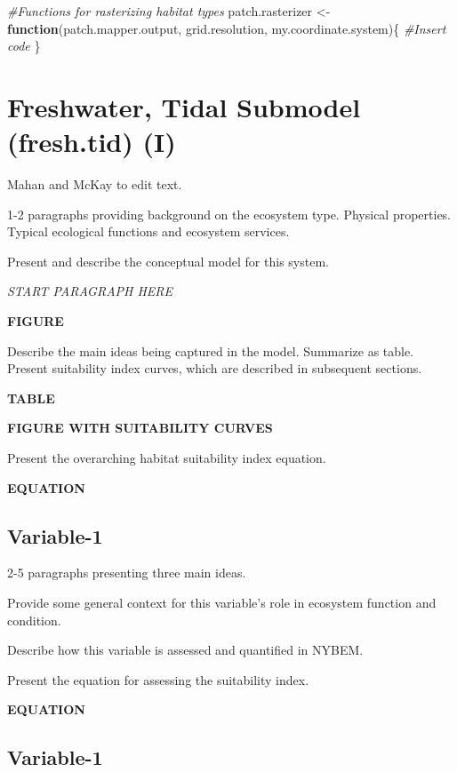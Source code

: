 \documentclass[
]{book}
\newenvironment{Shaded}{\begin{snugshade}}{\end{snugshade}}
\newcommand{\CommentTok}[1]{\textcolor[rgb]{0.56,0.35,0.01}{\textit{#1}}}
\newcommand{\ControlFlowTok}[1]{\textcolor[rgb]{0.13,0.29,0.53}{\textbf{#1}}}
\newcommand{\NormalTok}[1]{#1}
\newcommand{\OtherTok}[1]{\textcolor[rgb]{0.56,0.35,0.01}{#1}}
\begin{document}
\begin{Shaded}
\begin{Highlighting}[]
\CommentTok{\#Functions for rasterizing habitat types}
\NormalTok{patch.rasterizer }\OtherTok{\textless{}{-}} \ControlFlowTok{function}\NormalTok{(patch.mapper.output, grid.resolution, my.coordinate.system)\{}
  \CommentTok{\#Insert code}
\NormalTok{\}}
\end{Highlighting}
\end{Shaded}

\hypertarget{freshwater-tidal-submodel-fresh.tid-i}{%
\section{Freshwater, Tidal Submodel (fresh.tid) (I)}\label{freshwater-tidal-submodel-fresh.tid-i}}

{Mahan and McKay to edit text.}

1-2 paragraphs providing background on the ecosystem type. Physical properties. Typical ecological functions and ecosystem services.

Present and describe the conceptual model for this system.

\emph{START PARAGRAPH HERE}

\textbf{FIGURE}

Describe the main ideas being captured in the model. Summarize as table. Present suitability index curves, which are described in subsequent sections.

\textbf{TABLE}

\textbf{FIGURE WITH SUITABILITY CURVES}

Present the overarching habitat suitability index equation.

\textbf{EQUATION}

\hypertarget{variable-1}{%
\subsection{Variable-1}\label{variable-1}}

2-5 paragraphs presenting three main ideas.

Provide some general context for this variable's role in ecosystem function and condition.

Describe how this variable is assessed and quantified in NYBEM.

Present the equation for assessing the suitability index.

\textbf{EQUATION}

\hypertarget{variable-1-1}{%
\subsection{Variable-1}\label{variable-1-1}}
\end{document}
